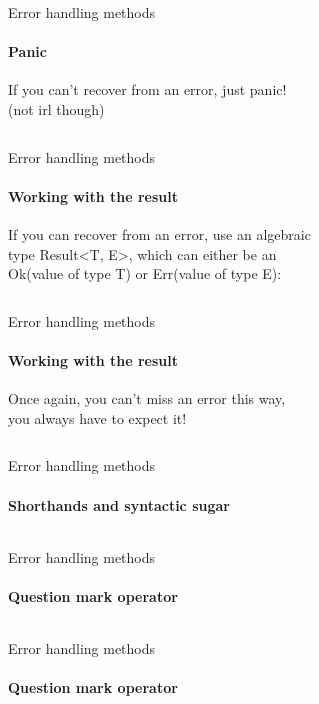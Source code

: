 \documentclass[usenames,dvipsnames,10pt,aspectratio=169]{beamer}
\begin{document}
\begin{frame}{Error handling methods}
	\framesubtitle{Panic}
\large
If you can't recover from an error, just \textcolor{ucuyellow}{panic!}\\
(not irl though)
\vspace{0.9cm}
\inputminted[fontsize=\Large]{rust}{code/error1.rs}
\normalsize
\end{frame}

\begin{frame}{Error handling methods}
\framesubtitle{Working with the result}

\normalsize
If you can recover from an error, use an algebraic\\
type \textcolor{ucuyellow}{Result<T, E>}, which can either be an\\
\textcolor{ucuyellow}{Ok(value of type T)} or 
\textcolor{ucuyellow}{Err(value of type E)}:
\vspace{0.2cm}
\inputminted[fontsize=\Large]{rust}{code/error2.rs}
\vspace{0.55cm}
\end{frame}

\begin{frame}{Error handling methods}
\framesubtitle{Working with the result}
\large
Once again, you can't miss an error this way,\\
you always have to expect it!
\vspace{0.2cm}
\inputminted[fontsize=\Large]{rust}{code/error3.rs}
\vspace{0.55cm}
\end{frame}

\begin{frame}{Error handling methods}
\framesubtitle{Shorthands and syntactic sugar}
\normalsize
\inputminted[fontsize=\Large]{rust}{code/error4.rs}
\end{frame}

\begin{frame}{Error handling methods}
\framesubtitle{Question mark operator}
\inputminted[fontsize=\large]{rust}{code/error5.rs}
\vspace{0.5cm}
\end{frame}

\begin{frame}{Error handling methods}
\framesubtitle{Question mark operator}
\inputminted[fontsize=\large]{rust}{code/error6.rs}
\end{frame}

\end{document}
